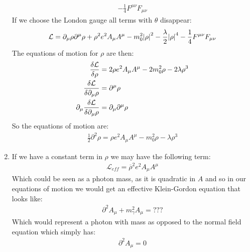 \documentclass[12pt]{article}
\renewcommand{\L}{\mathcal{L}}
\newcommand{\D}{\partial}
\begin{document}
\begin{enumerate}
\begin{align*}
    -\frac{1}{4}F^{\mu\nu}F_{\mu\nu}
  \end{align*}
  If we choose the London gauge all terms with $\theta$ disappear:
  \begin{align*}
    \L=\D_\mu\rho\D^\mu\rho+\rho^2e^2A_\mu A^\mu
    -m_0^2\abs{\rho}^2-\frac{\lambda}{2}\abs{\rho}^4
    -\frac{1}{4}F^{\mu\nu}F_{\mu\nu}
  \end{align*}
  The equations of motion for $\rho$ are then:
  \begin{align*}
    \fdv{\L}{\rho}&=2\rho e^2A_\mu A^\mu-2m_0^2\rho-2\lambda\rho^3\\
    \fdv{\L}{\D_\mu\rho}&=\D^\mu\rho\\
    \D_\mu\fdv{\L}{\D_\mu\rho}&=\D_\mu\D^\mu\rho
  \end{align*}
  So the equations of motion are:
  \begin{align*}
    \frac{1}{2}\D^2\rho=\rho e^2A_\mu A^\mu-m_0^2\rho-\lambda\rho^3
  \end{align*}
\item If we have a constant term in $\rho$ we may have the following term:
  \begin{align*}
    \L_{eff}=\overline{\rho}^2e^2A_\mu A^\mu
  \end{align*}
  Which could be seen as a photon mass, as it is quadratic in $A$ and so in our equations of motion we would get an effective Klein-Gordon equation that looks like:
  \begin{align*}
    \D^2A_\mu+m_\gamma^2A_\mu=???
  \end{align*}
  Which would represent a photon with mass as opposed to the normal field equation which simply has:
  \begin{align*}
    \D^2A_\mu=0
  \end{align*}
\end{enumerate}
\end{document}

